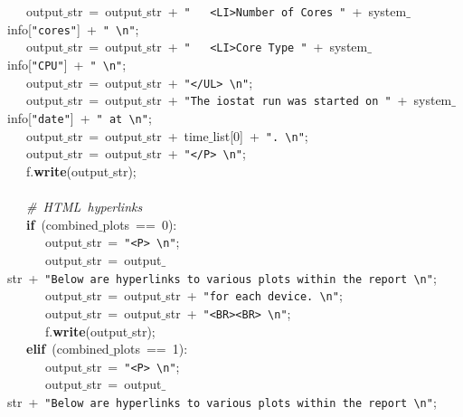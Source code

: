 \mbox{}\ \ \ output$\_$str\ =\ output$\_$str\ +\ \texttt{"{}\ \ \ \textless{}LI\textgreater{}Number\ of\ Cores\ "{}}\ +\ system$\_$info[\texttt{"{}cores"{}}]\ +\ \texttt{"{}\ \textbackslash{}n"{}}; \\
\mbox{}\ \ \ output$\_$str\ =\ output$\_$str\ +\ \texttt{"{}\ \ \ \textless{}LI\textgreater{}Core\ Type\ "{}}\ +\ system$\_$info[\texttt{"{}CPU"{}}]\ +\ \texttt{"{}\ \textbackslash{}n"{}}; \\
\mbox{}\ \ \ output$\_$str\ =\ output$\_$str\ +\ \texttt{"{}\textless{}/UL\textgreater{}\ \textbackslash{}n"{}}; \\
\mbox{}\ \ \ output$\_$str\ =\ output$\_$str\ +\ \texttt{"{}The\ iostat\ run\ was\ started\ on\ "{}}\ +\ system$\_$info[\texttt{"{}date"{}}]\ +\ \texttt{"{}\ at\ \textbackslash{}n"{}}; \\
\mbox{}\ \ \ output$\_$str\ =\ output$\_$str\ +\ time$\_$list[0]\ +\ \texttt{"{}.\ \textbackslash{}n"{}}; \\
\mbox{}\ \ \ output$\_$str\ =\ output$\_$str\ +\ \texttt{"{}\textless{}/P\textgreater{}\ \textbackslash{}n"{}}; \\
\mbox{}\ \ \ f.\textbf{write}(output$\_$str); \\
\mbox{}\ \ \  \\
\mbox{}\ \ \ \textit{\#\ HTML\ hyperlinks} \\
\mbox{}\ \ \ \textbf{if}\ (combined$\_$plots\ ==\ 0): \\
\mbox{}\ \ \ \ \ \ output$\_$str\ =\ \texttt{"{}\textless{}P\textgreater{}\ \textbackslash{}n"{}}; \\
\mbox{}\ \ \ \ \ \ output$\_$str\ =\ output$\_$str\ +\ \texttt{"{}Below\ are\ hyperlinks\ to\ various\ plots\ within\ the\ report\ \textbackslash{}n"{}}; \\
\mbox{}\ \ \ \ \ \ output$\_$str\ =\ output$\_$str\ +\ \texttt{"{}for\ each\ device.\ \textbackslash{}n"{}}; \\
\mbox{}\ \ \ \ \ \ output$\_$str\ =\ output$\_$str\ +\ \texttt{"{}\textless{}BR\textgreater{}\textless{}BR\textgreater{}\ \textbackslash{}n"{}}; \\
\mbox{}\ \ \ \ \ \ f.\textbf{write}(output$\_$str); \\
\mbox{}\ \ \ \textbf{elif}\ (combined$\_$plots\ ==\ 1): \\
\mbox{}\ \ \ \ \ \ output$\_$str\ =\ \texttt{"{}\textless{}P\textgreater{}\ \textbackslash{}n"{}}; \\
\mbox{}\ \ \ \ \ \ output$\_$str\ =\ output$\_$str\ +\ \texttt{"{}Below\ are\ hyperlinks\ to\ various\ plots\ within\ the\ report\ \textbackslash{}n"{}}; \\
